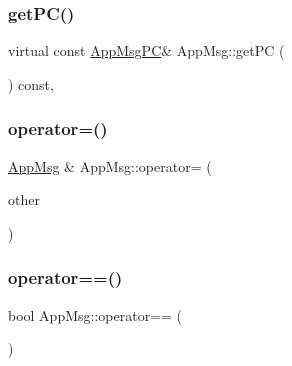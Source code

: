 \mbox{\label{class_app_msg_a19864419107e294ac7c64553ceb5a9f0}} 
\subsubsection{\texorpdfstring{get\+P\+C()}{getPC()}\hspace{0.1cm}{\footnotesize\ttfamily [2/2]}}
{\footnotesize\ttfamily virtual const \hyperlink{_app_msg__m_8h_abcd76636e4b750d033ffc348601dd7a2}{App\+Msg\+PC}\& App\+Msg\+::get\+PC (\begin{DoxyParamCaption}{ }\end{DoxyParamCaption}) const\hspace{0.3cm}{\ttfamily [inline]}, {\ttfamily [virtual]}}

\mbox{\label{class_app_msg_abb8f6f1fa21e6597ff28f6df72b435ad}} 
\subsubsection{\texorpdfstring{operator=()}{operator=()}}
{\footnotesize\ttfamily \hyperlink{class_app_msg}{App\+Msg} \& App\+Msg\+::operator= (\begin{DoxyParamCaption}\item[{const \hyperlink{class_app_msg}{App\+Msg} \&}]{other }\end{DoxyParamCaption})}

\mbox{\label{class_app_msg_a5eb13ac34b1364ca33dbf8f563b9e81c}} 
\subsubsection{\texorpdfstring{operator==()}{operator==()}}
{\footnotesize\ttfamily bool App\+Msg\+::operator== (\begin{DoxyParamCaption}\item[{const \hyperlink{class_app_msg}{App\+Msg} \&}]{ }\end{DoxyParamCaption})\hspace{0.3cm}{\ttfamily [protected]}}

\mbox{\label{class_app_msg_a97036583c6a13015d1be1ac6cf87505e}} 
